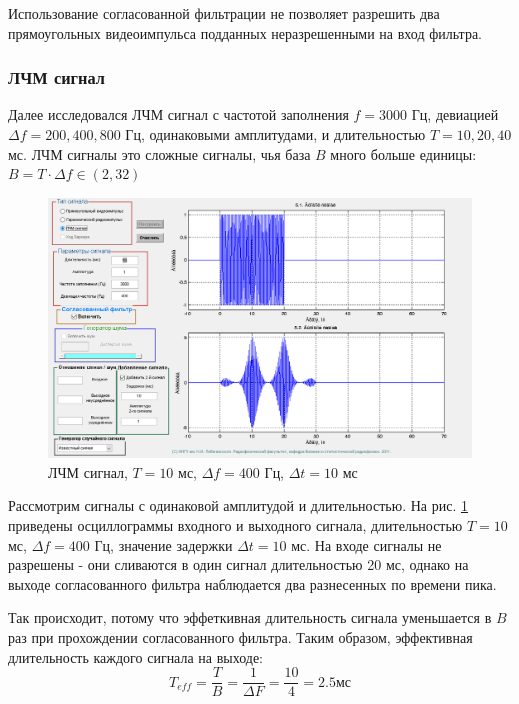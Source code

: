 Использование согласованной фильтрации не позволяет разрешить два прямоугольных видеоимпульса подданных неразрешенными на вход фильтра. 



\subsubsection{ЛЧМ сигнал}
Далее исследовался ЛЧМ сигнал с частотой заполнения $f=3000$ Гц, девиацией $\Delta f = 200, 400, 800$ Гц, одинаковыми амплитудами, и
длительностью $T=10, 20, 40$ мс. ЛЧМ сигналы это сложные сигналы, чья база $B$ много больше единицы: $B = T \cdot \Delta f \in (2,32)$
\begin{figure}[H]
    \centering
    \includegraphics[width=0.6\linewidth]{imgs/task5/lfm_dev400/t5s21_dur10_del10_dev400.png}
    \caption{ЛЧМ сигнал, $T=10$ мс, $\Delta f=400$ Гц, $\Delta t=10$ мс}
    \label{fig:t5s21_dur10_del10_dev400}
\end{figure}

Рассмотрим сигналы с одинаковой амплитудой и длительностью.
На рис. \ref{fig:t5s21_dur10_del10_dev400} приведены осциллограммы входного и выходного сигнала, длительностью
$T=10$ мс, $\Delta f=400$ Гц, значение задержки $\Delta t = 10$ мс. На входе сигналы не разрешены - они сливаются в один
сигнал длительностью 20 мс, однако на выходе согласованного фильтра наблюдается два разнесенных по времени пика.

Так происходит, потому  что эффеткивная длительность сигнала уменьшается в $B$ раз при прохождении согласованного фильтра. Таким образом,
эффективная длительность каждого сигнала на выходе:
\begin{equation}
    T_{eff} = \frac{T}{B} = \frac{1}{\Delta F}=\frac{10}{4} = 2.5 \text{мс}
    \label{eq:effective_dur}
\end{equation}


